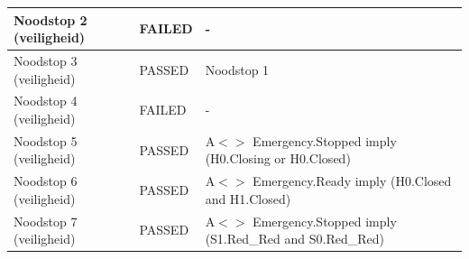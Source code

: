 \documentclass{article}
\begin{document}
\begin{tabular}{ |p{4cm}||p{2cm}|p{7cm}|}
            Noodstop 2 (veiligheid)                         &           \leavevmode\color[HTML]{FF0000} FAILED          &         -        \\ \hline
            Noodstop 3 (veiligheid)                         &           \leavevmode\color[HTML]{32CD32} PASSED          &         Noodstop 1        \\ \hline
            Noodstop 4 (veiligheid)                         &           \leavevmode\color[HTML]{FF0000} FAILED          &         -        \\ \hline
            Noodstop 5 (veiligheid)                         &           \leavevmode\color[HTML]{32CD32} PASSED          &         A$<>$ Emergency.Stopped imply (H0.Closing or H0.Closed)        \\ \hline
            Noodstop 6 (veiligheid)                         &           \leavevmode\color[HTML]{32CD32} PASSED          &         A$<>$ Emergency.Ready imply (H0.Closed and H1.Closed)        \\ \hline
            Noodstop 7 (veiligheid)                         &           \leavevmode\color[HTML]{32CD32} PASSED          &         A$<>$ Emergency.Stopped imply (S1.Red\_Red and S0.Red\_Red)\\
        \hline
    \end{tabular}





\newpage


\end{document}
